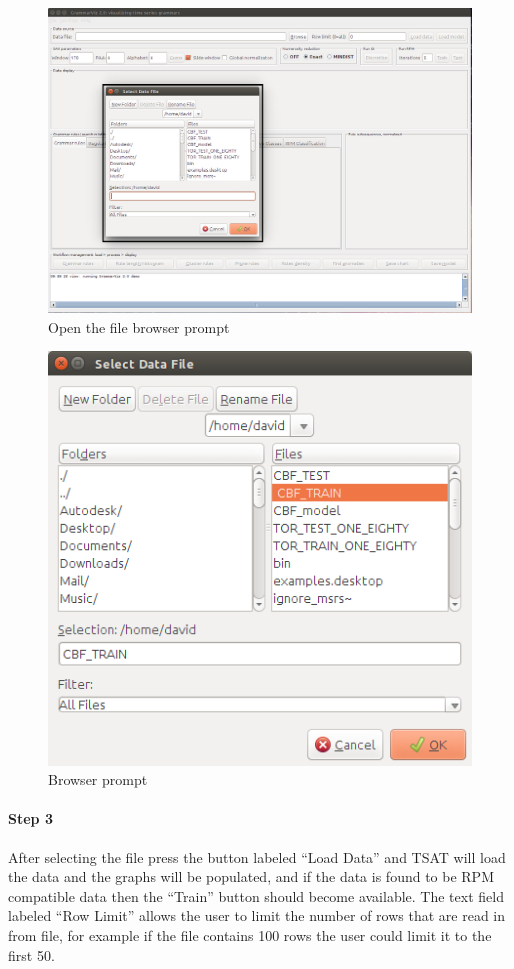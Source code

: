 \documentclass[letterpaper, 12pt]{article}
\begin{document}
\begin{figure}[H]
  \includegraphics[width=\textwidth]{TSAT-training-step-2}
  \caption{Open the file browser prompt}
  \label{fig:TSAT-training-step-2}
\end{figure}
\begin{figure}[H]
  \center
  \includegraphics[width=.4\textwidth]{TSAT-training-step-3}
  \caption{Browser prompt}
  \label{fig:TSAT-training-step-3}
\end{figure}

\newpage
\paragraph{Step 3}
After selecting the file press the button labeled ``Load Data'' and  TSAT will load the data and the graphs will be populated, and if the data is found to be RPM compatible data then the ``Train'' button should become available. The text field labeled ``Row Limit'' allows the user to limit the number of rows that are read in from file, for example if the file contains 100 rows the user could limit it to the first 50. 
\end{document}
